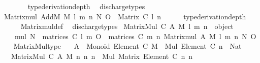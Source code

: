 \begin{isabellebody}
\ \ \ \ \ \ \isamarkupfalse%
\ {\isacharbrackleft}{\kern0pt}{\isacharbrackleft}{\kern0pt}type{\isacharunderscore}{\kern0pt}derivation{\isacharunderscore}{\kern0pt}depth{\isacharequal}{\kern0pt}{}{\isacharbrackright}{\kern0pt}{\isacharbrackright}{\kern0pt}\ \isamarkupfalse%
\ discharge{\isacharunderscore}{\kern0pt}types\isanewline
\ \ \isacommand{{\isacharbraceright}{\kern0pt}}\isamarkupfalse%
\isanewline
\ \ \isamarkupfalse%
\ {\isachardoublequoteopen}Matrix{\isacharunderscore}{\kern0pt}mul\ AddM\ M\ l\ m\ n\ N\ O\ {\isacharcolon}{\kern0pt}\ Matrix\ C\ l\ n{\isachardoublequoteclose}\isanewline
\ \ \ \ \isamarkupfalse%
\ {\isacharbrackleft}{\kern0pt}{\isacharbrackleft}{\kern0pt}type{\isacharunderscore}{\kern0pt}derivation{\isacharunderscore}{\kern0pt}depth{\isacharequal}{\kern0pt}{}{\isacharbrackright}{\kern0pt}{\isacharbrackright}{\kern0pt}\isanewline
\ \ \ \ \isamarkupfalse%
\ Matrix{\isacharunderscore}{\kern0pt}mul{\isacharunderscore}{\kern0pt}def\ \isamarkupfalse%
\ discharge{\isacharunderscore}{\kern0pt}types\isanewline
{}\isamarkupfalse%
%
\endisatagproof
{\isafoldproof}%
%
\isadelimproof
\isanewline
%
\endisadelimproof
\isanewline
{}\isamarkupfalse%
\ {\isachardoublequoteopen}Matrix{\isacharunderscore}{\kern0pt}Mul\ C\ A\ M\ l\ m\ n\ {\isasymequiv}\ object\ {\isacharbraceleft}{\kern0pt}\isanewline
\ \ \ \ {\isasymlangle}{\isacharat}{\kern0pt}mul{\isacharcomma}{\kern0pt}\ {\isasymlambda}N\ {\isasymin}\ matrices\ C\ l\ m{\isachardot}{\kern0pt}\ {\isacharparenleft}{\kern0pt}{\isasymlambda}O\ {\isasymin}\ matrices\ C\ m\ n{\isachardot}{\kern0pt}\ Matrix{\isacharunderscore}{\kern0pt}mul\ A\ M\ l\ m\ n\ N\ O{\isacharparenright}{\kern0pt}{\isasymrangle}\isanewline
\ \ {\isacharbraceright}{\kern0pt}{\isachardoublequoteclose}\isanewline
\isanewline
{}\isamarkupfalse%
\ Matrix{\isacharunderscore}{\kern0pt}Mul{\isacharunderscore}{\kern0pt}type{\isacharcolon}{\kern0pt}\isanewline
\ \ \ {\isachardoublequoteopen}A\ {\isacharcolon}{\kern0pt}\ Monoid\ {\isacharparenleft}{\kern0pt}Element\ C{\isacharparenright}{\kern0pt}{\isachardoublequoteclose}\ {\isachardoublequoteopen}M\ {\isacharcolon}{\kern0pt}\ Mul\ {\isacharparenleft}{\kern0pt}Element\ C{\isacharparenright}{\kern0pt}{\isachardoublequoteclose}\ {\isachardoublequoteopen}n\ {\isacharcolon}{\kern0pt}\ Nat{\isachardoublequoteclose}\isanewline
\ \ \ {\isachardoublequoteopen}Matrix{\isacharunderscore}{\kern0pt}Mul\ C\ A\ M\ n\ n\ n\ {\isacharcolon}{\kern0pt}\ Mul\ {\isacharparenleft}{\kern0pt}Matrix\ {\isacharparenleft}{\kern0pt}Element\ C{\isacharparenright}{\kern0pt}\ n\ n{\isacharparenright}{\kern0pt}{\isachardoublequoteclose}\isanewline

\end{isabellebody}
